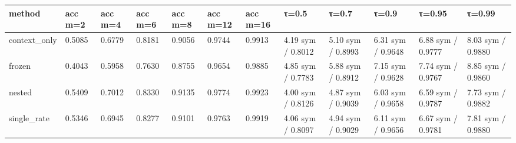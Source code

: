\begin{tabular}{llllllllllll}
\hline
method & acc m=2 & acc m=4 & acc m=6 & acc m=8 & acc m=12 & acc m=16 & τ=0.5 & τ=0.7 & τ=0.9 & τ=0.95 & τ=0.99 \\
\hline
context\_only & 0.5085 & 0.6779 & 0.8181 & 0.9056 & 0.9744 & 0.9913 & 4.19 sym / 0.8012 & 5.10 sym / 0.8993 & 6.31 sym / 0.9648 & 6.88 sym / 0.9777 & 8.03 sym / 0.9880 \\
frozen & 0.4043 & 0.5958 & 0.7630 & 0.8755 & 0.9654 & 0.9885 & 4.85 sym / 0.7783 & 5.88 sym / 0.8912 & 7.15 sym / 0.9628 & 7.74 sym / 0.9767 & 8.85 sym / 0.9860 \\
nested & 0.5409 & 0.7012 & 0.8330 & 0.9135 & 0.9774 & 0.9923 & 4.00 sym / 0.8126 & 4.87 sym / 0.9039 & 6.03 sym / 0.9658 & 6.59 sym / 0.9787 & 7.73 sym / 0.9882 \\
single\_rate & 0.5346 & 0.6945 & 0.8277 & 0.9101 & 0.9763 & 0.9919 & 4.06 sym / 0.8097 & 4.94 sym / 0.9029 & 6.11 sym / 0.9656 & 6.67 sym / 0.9781 & 7.81 sym / 0.9880 \\
\hline
\end{tabular}
